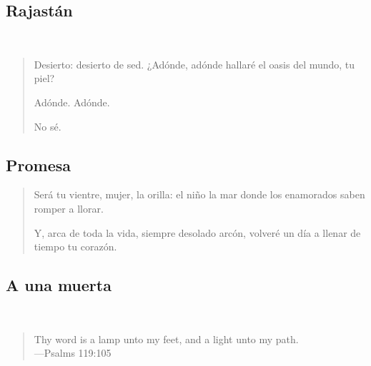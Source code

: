 \documentclass[a4paper, 12pt]{article}
\begin{document}
\pagebreak
\subsection{Rajastán}
~ 

\begin{verse}
    
Desierto:
desierto de sed.
¿Adónde,
adónde hallaré
el oasis
del mundo, tu piel?

Adónde.
Adónde.

No sé.
\end{verse}

\pagebreak
\subsection{Promesa}

\begin{verse}
Será tu vientre, mujer,
la orilla: el niño la mar
donde los enamorados
saben romper a llorar.
~ 

Y, arca de toda la vida,
siempre desolado arcón,
volveré un día a llenar
de tiempo tu corazón.
\end{verse}

\pagebreak
\subsection{A una muerta}
~ 
\scriptsize
\begin{quote}
    \hspace*{\fill}    Thy word is a lamp unto my feet, 
    and a light unto my path.\\
\hspace*{\fill}—Psalms 119:105
\end{quote}
\end{document}
